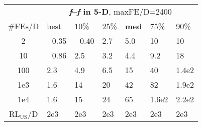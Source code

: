 \begin{tabular}{c|llllll}
 & \multicolumn{6}{|c}{\textbf{\textit{f}\raisebox{-0.35ex}{1}--\textit{f}\raisebox{-0.35ex}{24} in 5-D}, maxFE/D=2400}\\
\#FEs/D & best & 10\% & 25\% & \textbf{med} & 75\% & 90\%\\
2 & ~\,0.35 & ~\,0.40 & \hspace*{1ex}2.7 & \hspace*{1ex}5.0 & 10 & 10\\
10 & ~\,0.86 & \hspace*{1ex}2.5 & \hspace*{1ex}3.2 & \hspace*{1ex}4.4 & \hspace*{1ex}9.2 & 18\\
100 & \hspace*{1ex}2.3 & \hspace*{1ex}4.9 & \hspace*{1ex}6.5 & 15 & 40 & 1.4e2\\
1e3 & \hspace*{1ex}1.6 & 14 & 20 & 42 & 82 & 1.9e2\\
1e4 & \hspace*{1ex}1.6 & 15 & 24 & 65 & 1.6e2 & 2.2e2\\
$\text{RL}_{\text{US}}$/D & 2e3 & 2e3 & 2e3 & 2e3 & 2e3 & 2e3
\end{tabular}
